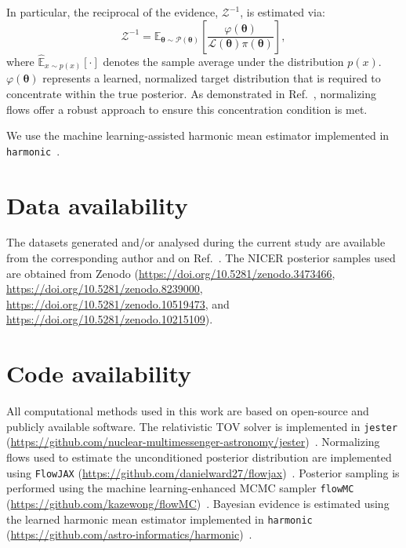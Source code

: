 \documentclass[prd,twocolumn,a4paper,floatfix,nofootinbib,preprintnumbers,superscriptaddress]{revtex4-1}
\begin{document}
In particular, the reciprocal of the evidence, \( \mathcal{Z}^{-1} \), is estimated via:
\begin{equation}
    \mathcal{Z}^{-1} = \widehat{\mathbb{E}}_{\boldsymbol{\theta} \sim \mathcal{P}(\boldsymbol{\theta})}\left[ \frac{\varphi(\boldsymbol{\theta})}{\mathcal{L}(\boldsymbol{\theta})\pi(\boldsymbol{\theta})}\right],
\end{equation}
where $\widehat{\mathbb{E}}_{x \sim p(x)}[\cdot]$ denotes the sample average under the distribution $ p(x)$. $\varphi(\boldsymbol{\theta})$ represents a learned, normalized target distribution that is required to concentrate within the true posterior. As demonstrated in Ref.~\cite{Polanska:2024arc}, normalizing flows offer a robust approach to ensure this concentration condition is met.

We use the machine learning-assisted harmonic mean estimator implemented in \texttt{harmonic}~\cite{astroinformatics:harmonic}.

\section*{Data availability}
The datasets generated and/or analysed during the current study are available from the corresponding author and on Ref.~\cite{pang_2026_18978514}. The NICER posterior samples used are obtained from Zenodo (\url{https://doi.org/10.5281/zenodo.3473466}, \url{https://doi.org/10.5281/zenodo.8239000}, \url{https://doi.org/10.5281/zenodo.10519473}, and \url{https://doi.org/10.5281/zenodo.10215109}).

\section*{Code availability}
All computational methods used in this work are based on open-source and publicly available software. The relativistic TOV solver is implemented in \texttt{jester} (\url{https://github.com/nuclear-multimessenger-astronomy/jester})~\cite{Wouters:2025zju}. Normalizing flows used to estimate the unconditioned posterior distribution are implemented using \texttt{FlowJAX} (\url{https://github.com/danielward27/flowjax})~\cite{ward2023flowjax}. Posterior sampling is performed using the machine learning-enhanced MCMC sampler \texttt{flowMC} (\url{https://github.com/kazewong/flowMC})~\cite{Wong:2022xvh, Gabrie:2021tlu}. Bayesian evidence is estimated using the learned harmonic mean estimator implemented in \texttt{harmonic} (\url{https://github.com/astro-informatics/harmonic})~\cite{astroinformatics:harmonic}.\\
\end{document}
